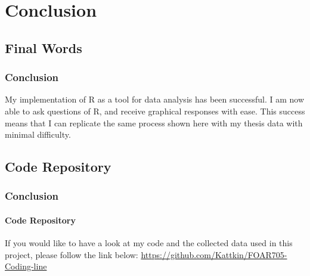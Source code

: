 \documentclass[aspectratio=1610]{beamer}
\begin{document}
\section{Conclusion}
\subsection{Final Words}
\begin{frame}
\frametitle{Conclusion}
My implementation of R as a tool for data analysis has been successful.
\newline 
I am now able to ask questions of R, and receive graphical responses with ease.
\newline 
This success means that I can replicate the same process shown here with my thesis data with minimal difficulty.
\end{frame}
\subsection{Code Repository}
\begin{frame}
\frametitle{Conclusion}
\framesubtitle{Code Repository}
If you would like to have a look at my code and the collected data used in this project, please follow the link below:
\newline
\newline
\url{https://github.com/Kattkin/FOAR705-Coding-line}
\end{frame}
\end{document}
